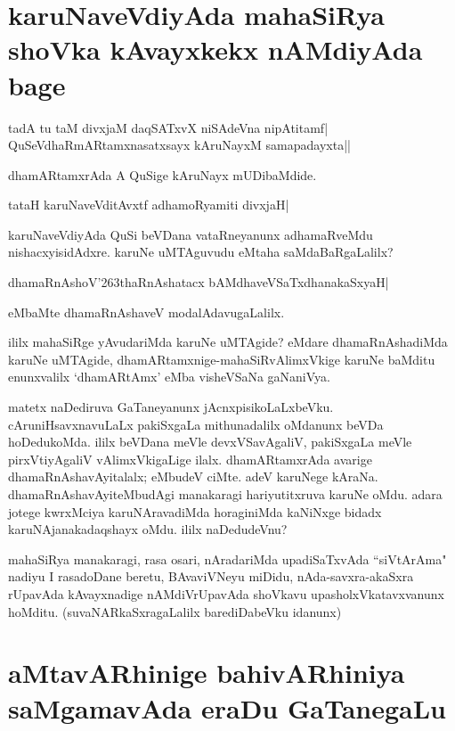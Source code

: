 \section*{karuNaveVdiyAda mahaSiRya shoVka kAvayxkekx nAMdiyAda bage} 

\begin{shloka} 
tadA tu taM divxjaM daqSATxvX niSAdeVna nipAtitamf|\label{199}\\ 
QuSeVdhaRmARtamxnasatxsayx kAruNayxM samapadayxta|| 
\end{shloka}

dhamARtamxrAda A QuSige kAruNayx mUDibaMdide. 

\begin{shloka} 
tataH karuNaveVditAvxtf adhamoR\s yamiti divxjaH| 
\end{shloka}

karuNaveVdiyAda QuSi beVDana vataRneyanunx adhamaRveMdu nishacxyisidAdxre. karuNe uMTAguvudu eMtaha saMdaBaRgaLalilx? 

\begin{shloka}
dhamaRnAshoV\char'263thaRnAshatacx bAMdhaveVSaTxdhanakaSxyaH|\label{199a}
\end{shloka}
eMbaMte dhamaRnAshaveV modalAdavugaLalilx. 

ililx mahaSiRge yAvudariMda karuNe uMTAgide? eMdare dhamaRnAshadiMda karuNe uMTAgide, dhamARtamxnige-mahaSiRvAlimxVkige karuNe baMditu enunxvalilx `dhamARtAmx' eMba visheVSaNa gaNaniVya. 

matetx naDediruva GaTaneyanunx jAcnxpisikoLaLxbeVku. cAruniHsavxnavuLaLx pakiSxgaLa mithunadalilx oMdanunx beVDa hoDedukoMda. ililx beVDana meVle devxVSavAgaliV, pakiSxgaLa meVle pirxVtiyAgaliV vAlimxVkigaLige ilalx. dhamARtamxrAda avarige dhamaRnAshavAyitalalx; eMbudeV ciMte. adeV karuNege kAraNa. dhamaRnAshavAyiteMbudAgi manakaragi hariyutitxruva karuNe oMdu. adara jotege kwrxMciya karuNAravadiMda horaginiMda kaNiNxge bidadx karuNAjanakadaqshayx oMdu. ililx naDedudeVnu? 

mahaSiRya manakaragi, rasa osari, nAradariMda upadiSaTxvAda ``siVtArAma" nadiyu I rasadoDane beretu, BAvaviVNeyu miDidu, nAda-savxra-akaSxra rUpavAda kAvayxnadige nAMdiVrUpavAda shoVkavu upasholxVkatavxvanunx hoMditu. (suvaNARkaSxragaLalilx barediDabeVku idanunx) 

\section*{aMtavARhinige bahivARhiniya saMgamavAda eraDu GaTanegaLu} 

